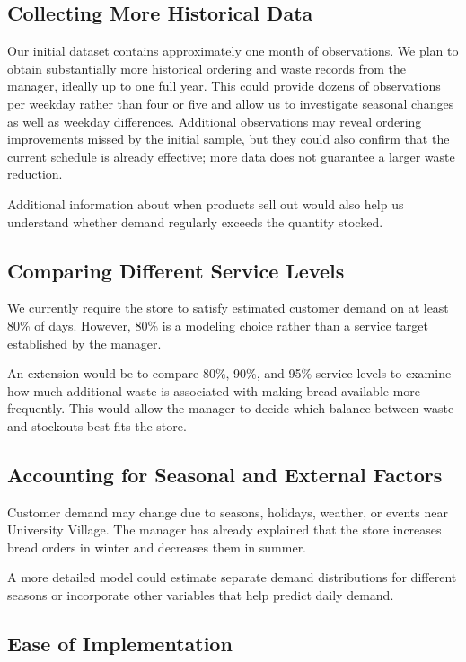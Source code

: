 \documentclass[11pt]{article}
\begin{document}
\subsection{Collecting More Historical Data}

Our initial dataset contains approximately one month of observations. We plan to obtain substantially more historical ordering and waste records from the manager, ideally up to one full year. This could provide dozens of observations per weekday rather than four or five and allow us to investigate seasonal changes as well as weekday differences. Additional observations may reveal ordering improvements missed by the initial sample, but they could also confirm that the current schedule is already effective; more data does not guarantee a larger waste reduction.

Additional information about when products sell out would also help us understand whether demand regularly exceeds the quantity stocked.

\subsection{Comparing Different Service Levels}

We currently require the store to satisfy estimated customer demand on at least 80\% of days. However, 80\% is a modeling choice rather than a service target established by the manager.

An extension would be to compare 80\%, 90\%, and 95\% service levels to examine how much additional waste is associated with making bread available more frequently. This would allow the manager to decide which balance between waste and stockouts best fits the store.

\subsection{Accounting for Seasonal and External Factors}

Customer demand may change due to seasons, holidays, weather, or events near University Village. The manager has already explained that the store increases bread orders in winter and decreases them in summer.

A more detailed model could estimate separate demand distributions for different seasons or incorporate other variables that help predict daily demand.

\subsection{Ease of Implementation}
\end{document}
